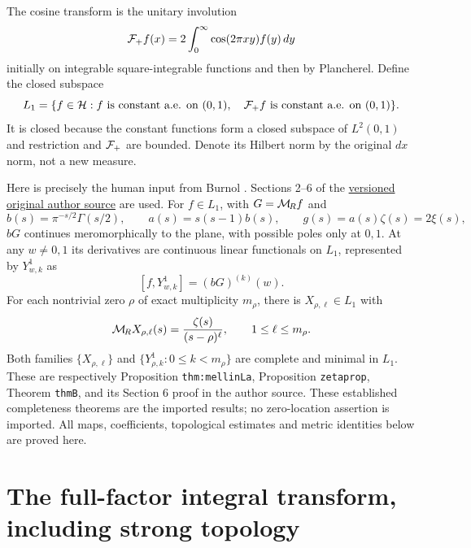 The cosine transform is the unitary involution
\[
 \mathcal F_+ f(x)=2\int_0^\infty\cos(2\pi xy)f(y)\,dy
\]
initially on integrable square-integrable functions and then by
Plancherel. Define the closed subspace
\[
 L_1=\{f\in\mathcal H:f\text{ is constant a.e. on }(0,1),\quad
                      \mathcal F_+ f\text{ is constant a.e. on }(0,1)\}.
\]
It is closed because the constant functions form a closed subspace
of $L^2(0,1)$ and restriction and $\mathcal F_+$ are bounded. Denote its
Hilbert norm by the original $dx$ norm, not a new measure.

Here is precisely the human input from Burnol \cite{mburn:Burnol}.
Sections 2--6 of the
\href{https://arxiv.org/abs/math/0203120v7}{versioned original author source}
are used.
For $f\in L_1$, with $G=\mathcal M_{\!R} f$ and
\begin{equation}\label{mburn:eq:abg}
 b(s)=\pi^{-s/2}\Gamma(s/2),\qquad
 a(s)=s(s-1)b(s),\qquad g(s)=a(s)\zeta(s)=2\xi(s),
\end{equation}
$bG$ continues meromorphically to the plane, with possible poles
only at $0,1$. At any $w\ne0,1$ its derivatives are continuous
linear functionals on $L_1$, represented by $Y^1_{w,k}$ as
\begin{equation}\label{mburn:eq:burnol-eval}
 [f,Y^1_{w,k}]=(bG)^{(k)}(w).
\end{equation}
For each nontrivial zero $\rho$ of exact multiplicity $m_\rho$,
there is $X_{\rho,\ell}\in L_1$ with
\begin{equation}\label{mburn:eq:X}
 \mathcal M_{\!R} X_{\rho,\ell}(s)=\frac{\zeta(s)}{(s-\rho)^\ell},
                 \qquad 1\leq\ell\leq m_\rho.
\end{equation}
Both families $\{X_{\rho,\ell}\}$ and
$\{Y^1_{\rho,k}:0\leq k<m_\rho\}$ are complete and minimal in
$L_1$. These are respectively Proposition \texttt{thm:mellinLa},
Proposition \texttt{zetaprop}, Theorem \texttt{thmB}, and its
Section 6 proof in the author source. These established completeness
theorems are the imported results; no zero-location assertion is
imported. All maps, coefficients, topological estimates and metric
identities below are proved here.

\section{The full-factor integral transform, including strong topology}

